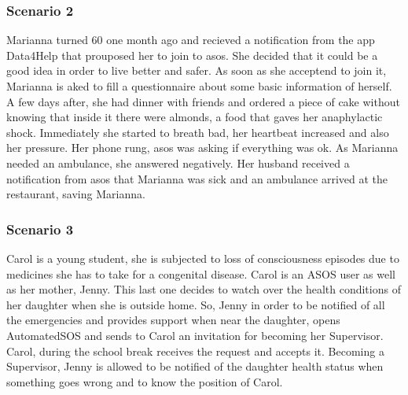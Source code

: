 \paragraph{}


{\color{Blue}\subsubsection{Scenario 2}}
Marianna  turned  60  one  month  ago  and  recieved  a  notification  from the  app  Data4Help  that  prouposed  her  to  join  to  asos.  She  decided  that  it  could  be  a  good  idea  in  order  to  live  better  and  safer.  As  soon  as  she  acceptend  to  join  it,  Marianna  is  aked  to  fill  a  questionnaire  about  some  basic  information  of  herself.  A  few  days  after,  she  had  dinner  with  friends  and  ordered  a  piece  of  cake  without  knowing  that  inside  it  there  were  almonds,  a  food  that  gaves  her  anaphylactic  shock.  Immediately  she  started  to  breath  bad,  her  heartbeat  increased  and  also  her  pressure.  Her  phone  rung,  asos  was  asking  if  everything  was  ok.  As  Marianna  needed  an  ambulance,  she  answered  negatively.  Her  husband received a notification from asos that Marianna was sick and an ambulance arrived at the restaurant, saving Marianna.   
\paragraph{}


{\color{Blue}\subsubsection{Scenario 3}}
Carol is a young student, she is subjected to loss of consciousness episodes due to medicines she has to take for a congenital disease. Carol is an ASOS user as well as her mother, Jenny. This last one decides to watch over the health conditions of her daughter when she is outside home. So, Jenny in order to be notified of all the emergencies and provides support when near the daughter, opens AutomatedSOS and sends to Carol an invitation for becoming her Supervisor. Carol, during the school break receives the request and accepts it. Becoming a Supervisor, Jenny is allowed to be notified of the daughter health status when something goes wrong and to know the position of Carol.
